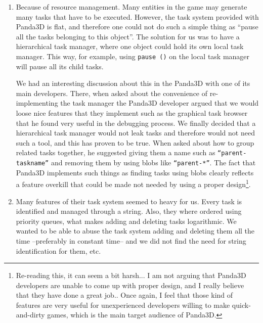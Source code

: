 \documentclass[a4paper,10pt]{article}
\begin{document}
\begin{enumerate}
\item Because of resource management. Many entities in the game may
  generate many tasks that have to be executed. However, the task
  system provided with Panda3D is flat, and therefore one could not do
  such a simple thing as ``pause all the tasks belonging to this
  object''. The solution for us was to have a hierarchical task
  manager, where one object could hold its own local task
  manager. This way, for example, using \texttt{pause ()} on the local
  task manager will pause all its child tasks.

  We had an interesting discussion about this in the Panda3D with one
  of its main developers\cite{task-forum}. There, when asked about the
  convenience of re-implementing the task manager the Panda3D
  developer argued that we would loose nice features that they
  implement such as the graphical task browser that he found very
  useful in the debugging process. We finally decided that a
  hierarchical task manager would not leak tasks and therefore would
  not need such a tool, and this has proven to be true. When asked
  about how to group related tasks together, he suggested giving them
  a name such as \texttt{``parent-taskname''} and removing them by
  using blobs like \texttt{``parent-*''}. The fact that Panda3D
  implements such things as finding tasks using blobs clearly reflects
  a feature overkill that could be made not needed by using a proper
  design\footnote{Re-reading this, it can seem a bit harsh... I am not
    arguing that Panda3D developers are unable to come up with proper
    design, and I really believe that they have done a great
    job.. Once again, I feel that those kind of features are very
    useful for unexperienced developers willing to make
    quick-and-dirty games, which is the main target audience of
    Panda3D.}.

\item Many features of their task system seemed to heavy for us. Every
  task is identified and managed through a string. Also, they where
  ordered using priority queues, what makes adding and deleting tasks
  logarithmic. We wanted to be able to abuse the task system adding
  and deleting them all the time --preferably in constant time-- and
  we did not find the need for string identification for them, etc.
\end{enumerate}
\end{document}
